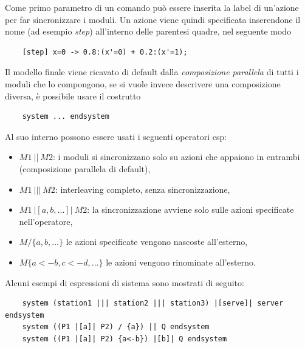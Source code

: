 Come primo parametro di un comando può essere inserita la label di un'azione per far sincronizzare i moduli. Un azione viene quindi specificata inserendone il nome (ad esempio \emph{step}) all'interno delle parentesi quadre, nel seguente modo
\begin{verbatim}
	[step] x=0 -> 0.8:(x'=0) + 0.2:(x'=1);
\end{verbatim}

Il modello finale viene ricavato di default dalla \emph{composizione parallela} di tutti i moduli che lo compongono, se si vuole invece descrivere una composizione diversa, è possibile usare il costrutto
\begin{verbatim}
	system ... endsystem
\end{verbatim}
Al suo interno possono essere usati i seguenti operatori \ac{csp}:
\begin{itemize}
	\item $M1\ ||\ M2$: i moduli si sincronizzano solo su azioni che appaiono in entrambi (composizione parallela di default),
	\item $M1\ |||\ M2$: interleaving completo, senza sincronizzazione,
	\item $M1\ |[a,b,...]|\ M2$: la sincronizzazione avviene solo sulle azioni specificate nell'operatore,
	\item $M \slash \{a,b,...\}$ le azioni specificate vengono nascoste all'esterno,
	\item $M \{a<-b,c<-d,...\}$ le azioni vengono rinominate all'esterno.
\end{itemize}
Alcuni esempi di espressioni di sistema sono mostrati di seguito:
\begin{verbatim}
	system (station1 ||| station2 ||| station3) |[serve]| server endsystem
	system ((P1 |[a]| P2) / {a}) || Q endsystem
	system ((P1 |[a]| P2) {a<-b}) |[b]| Q endsystem
\end{verbatim}
